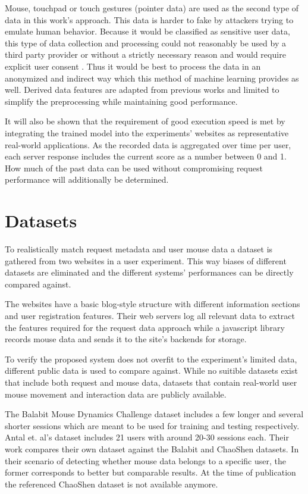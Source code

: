 \documentclass[
    fontsize=12pt,
    headings=small,
    parskip=half,           %
    bibliography=totoc,
    numbers=noenddot,       %
    open=any,               %
    final                   %
]{scrreprt}
\begin{document}
Mouse, touchpad or touch gestures (pointer data) are used as the second type of data in this work's approach. This data is harder to fake by attackers trying to emulate human behavior. Because it would be classified as sensitive user data, this type of data collection and processing could not reasonably be used by a third party provider or without a strictly necessary reason and would require explicit user consent \cite{GDPR}. Thus it would be best to process the data in an anonymized and indirect way which this method of machine learning provides as well. Derived data features are adapted from previous works and limited to simplify the preprocessing while maintaining good performance.

It will also be shown that the requirement of good execution speed is met by integrating the trained model into the experiments' websites as representative real-world applications. As the recorded data is aggregated over time per user, each server response includes the current score as a number between 0 and 1. How much of the past data can be used without compromising request performance will additionally be determined.

\section{Datasets}

To realistically match request metadata and user mouse data a dataset is gathered from two websites in a user experiment. This way biases of different datasets are eliminated and the different systems' performances can be directly compared against.

The websites have a basic blog-style structure with different information sections and user registration features. Their web servers log all relevant data to extract the features required for the request data approach while a javascript library records mouse data and sends it to the site's backends for storage.

To verify the proposed system does not overfit to the experiment's limited data, different public data is used to compare against. While no suitible datasets exist that include both request and mouse data, datasets that contain real-world user mouse movement and interaction data are publicly available.

The Balabit Mouse Dynamics Challenge dataset \cite{BALABIT_CHALLENGE} includes a few longer and several shorter sessions which are meant to be used for training and testing respectively.
Antal et. al's dataset \cite{9111596} includes 21 users with around 20-30 sessions each. Their work compares their own dataset against the Balabit and ChaoShen datasets. In their scenario of detecting whether mouse data belongs to a specific user, the former corresponds to better but comparable results.
At the time of publication the referenced ChaoShen dataset is not available anymore.
\end{document}
